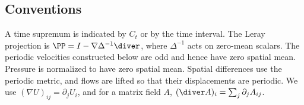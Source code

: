 \subsection*{Conventions}
A time supremum is indicated by $C_t$ or by the time interval. The
Leray projection is
$\PP=I-\nabla\Delta^{-1}\diver$, where $\Delta^{-1}$ acts on zero-mean
scalars. The periodic velocities
constructed below are odd and hence have zero spatial mean.
Pressure is normalized to have zero spatial mean. Spatial differences use the periodic
metric, and flows are lifted so that their displacements are periodic.
We use $(\nabla U)_{ij}=\partial_jU_i$, and for a matrix field $A$,
$(\diver A)_i=\sum_j\partial_jA_{ij}$.
